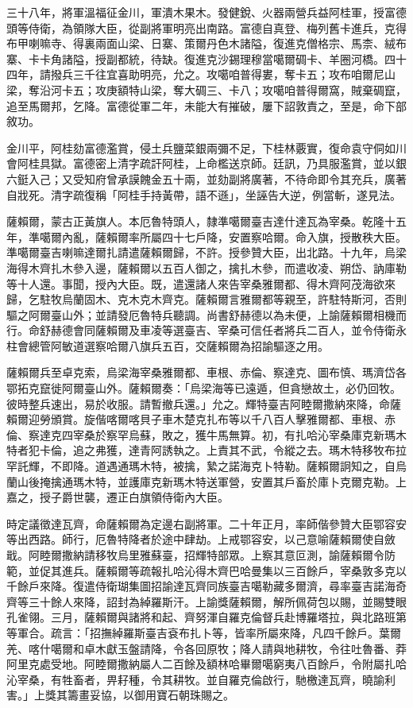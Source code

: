 \begin{pinyinscope}
三十八年，將軍溫福征金川，軍潰木果木。發健銳、火器兩營兵益阿桂軍，授富德頭等侍衛，為領隊大臣，從副將軍明亮出南路。富德自真登、梅列舊卡進兵，克得布甲喇嘛寺、得裏兩面山梁、日寨、策爾丹色木諸隘，復進克僧格宗、馬柰、絨布寨、卡卡角諸隘，授副都統，待缺。復進克沙錫理穆當噶爾碉卡、羊圈河橋。四十四年，請撥兵三千往宜喜助明亮，允之。攻噶咱普得婁，奪卡五；攻布咱爾尼山梁，奪沿河卡五；攻庚額特山梁，奪大碉三、卡八；攻噶咱普得爾窩，賊棄碉竄，追至馬爾邦，乞降。富德從軍二年，未能大有摧破，屢下詔敦責之，至是，命下部敘功。

金川平，阿桂劾富德濫賞，侵土兵鹽菜銀兩彌不足，下桂林覈實，復命袁守侗如川會阿桂具獄。富德密上清字疏訐阿桂，上命檻送京師。廷訊，乃具服濫賞，並以銀六鋌入己；又受知府曾承謨餽金五十兩，並劾副將廣著，不待命即令其充兵，廣著自戕死。清字疏復稱「阿桂手持黃帶，語不遜」，坐誣告大逆，例當斬，遂見法。

薩賴爾，蒙古正黃旗人。本厄魯特頭人，隸準噶爾臺吉達什達瓦為宰桑。乾隆十五年，準噶爾內亂，薩賴爾率所屬四十七戶降，安置察哈爾。命入旗，授散秩大臣。準噶爾臺吉喇嘛達爾扎請遣薩賴爾歸，不許。授參贊大臣，出北路。十九年，烏梁海得木齊扎木參入邊，薩賴爾以五百人御之，擒扎木參，而遣收凌、朔岱、訥庫勒等十人還。事聞，授內大臣。既，遣還諸人來告宰桑雅爾都、得木齊阿茂海欲來歸，乞駐牧烏蘭固木、克木克木齊克。薩賴爾言雅爾都等親至，許駐特斯河，否則驅之阿爾臺山外；並請發厄魯特兵聽調。尚書舒赫德以為未便，上諭薩賴爾相機而行。命舒赫德會同薩賴爾及車凌等選臺吉、宰桑可信任者將兵二百人，並令侍衛永柱會總管阿敏道選察哈爾八旗兵五百，交薩賴爾為招諭驅逐之用。

薩賴爾兵至卓克索，烏梁海宰桑雅爾都、車根、赤倫、察達克、圖布慎、瑪濟岱各鄂拓克竄徙阿爾臺山外。薩賴爾奏：「烏梁海等已遠遁，但貪戀故土，必仍回牧。彼時整兵速出，易於收服。請暫撤兵還。」允之。輝特臺吉阿睦爾撒納來降，命薩賴爾迎勞頒賞。旋偕喀爾喀貝子車木楚克扎布等以千八百人擊雅爾都、車根、赤倫、察達克四宰桑於察罕烏蘇，敗之，獲牛馬無算。初，有扎哈沁宰桑庫克新瑪木特者犯卡倫，追之弗獲，達青阿誘執之。上責其不武，令縱之去。瑪木特移牧布拉罕託輝，不即降。道遇通瑪木特，被擒，縶之諾海克卜特勒。薩賴爾詗知之，自烏蘭山後掩擒通瑪木特，並護庫克新瑪木特送軍營，安置其戶畜於庫卜克爾克勒。上嘉之，授子爵世襲，遷正白旗領侍衛內大臣。

時定議徵達瓦齊，命薩賴爾為定邊右副將軍。二十年正月，率師偕參贊大臣鄂容安等出西路。師行，厄魯特降者於途中肆劫。上戒鄂容安，以己意喻薩賴爾使自斂戢。阿睦爾撒納請移牧烏里雅蘇臺，招輝特部眾。上察其意叵測，諭薩賴爾令防範，並促其進兵。薩賴爾等疏報扎哈沁得木齊巴哈曼集以三百餘戶，宰桑敦多克以千餘戶來降。復遣侍衛瑚集圖招諭達瓦齊同族臺吉噶勒藏多爾濟，尋率臺吉諾海奇齊等三十餘人來降，詔封為綽羅斯汗。上諭獎薩賴爾，解所佩荷包以賜，並賜雙眼孔雀翎。三月，薩賴爾與諸將和起、齊努渾自羅克倫督兵赴博羅塔拉，與北路班第等軍合。疏言：「招撫綽羅斯臺吉袞布扎卜等，皆率所屬來降，凡四千餘戶。葉爾羌、喀什噶爾和卓木獻玉盤請降，令各回原牧；降人請與地耕牧，令往吐魯番、莽阿里克處受地。阿睦爾撒納屬人二百餘及額林哈畢爾噶窮夷八百餘戶，令附屬扎哈沁宰桑，有牲畜者，畀耔種，令其耕牧。並自羅克倫啟行，馳檄達瓦齊，曉諭利害。」上獎其籌畫妥協，以御用寶石朝珠賜之。


\end{pinyinscope}

